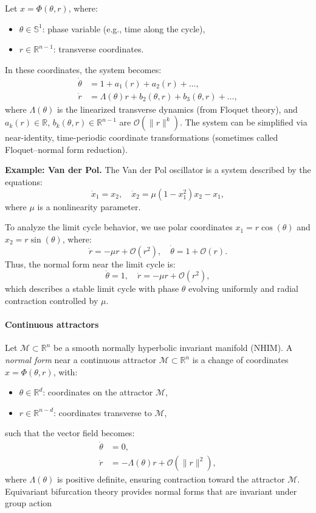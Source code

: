 \documentclass{article}
\theoremstyle{definition} \newtheorem{definition}{Definition}  \newtheorem{example}{Example}
\theoremstyle{remark} \newtheorem{remark}{Remark}
\newcounter{ct}
\newcommand{\field}[1]{\ensuremath{\mathbb{#1}}}
\newcommand{\reals}{\field{R}}
\newcommand{\manifold}{\mathcal{M}}
\begin{document}
Let \( x = \Phi(\theta, r) \), where: %
\begin{itemize}
  \item \( \theta \in \mathbb{S}^1 \): phase variable (e.g., time along the cycle),
  \item \( r \in \mathbb{R}^{n-1} \): transverse coordinates.
\end{itemize}
In these coordinates, the system becomes:
\[
\begin{aligned}
\dot{\theta} &= 1 + a_1(r) + a_2(r) + \dots, \\
\dot{r} &= \Lambda(\theta) r + b_2(\theta, r) + b_3(\theta, r) + \dots,
\end{aligned}
\]
where \( \Lambda(\theta) \) is the linearized transverse dynamics (from Floquet theory),
and  \( a_k(r) \in \mathbb{R} \), \( b_k(\theta, r) \in \mathbb{R}^{n-1} \) are \( \mathcal{O}(\|r\|^k) \).
The system can be simplified via near-identity, time-periodic coordinate transformations (sometimes called Floquet–normal form reduction).

\textbf{Example: Van der Pol.} 
The Van der Pol oscillator is a system described by the equations:
\[
\dot{x}_1 = x_2, \quad \dot{x}_2 = \mu (1 - x_1^2) x_2 - x_1,
\]
where \( \mu \) is a nonlinearity parameter.

To analyze the limit cycle behavior, we use polar coordinates \( x_1 = r \cos(\theta) \) and \( x_2 = r \sin(\theta) \), where:
\[
\dot{r} = -\mu r + \mathcal{O}(r^2), \quad \dot{\theta} = 1 + \mathcal{O}(r).
\]
Thus, the normal form near the limit cycle is:
\[
\dot{\theta} = 1, \quad \dot{r} = -\mu r + \mathcal{O}(r^2),
\]
which describes a stable limit cycle with phase \( \theta \) evolving uniformly and radial contraction controlled by \( \mu \).


\paragraph{Continuous attractors}%
Let $\manifold\subset\reals^n$  be a smooth normally hyperbolic invariant manifold (NHIM).
A \emph{normal form} near a continuous attractor \(\manifold \subset \mathbb{R}^n \) is a change of coordinates 
\( x = \Phi(\theta, r) \), with:
\begin{itemize}
  \item \( \theta \in \mathbb{R}^d \): coordinates on the attractor \( \manifold\),
  \item \( r \in \mathbb{R}^{n-d} \): coordinates transverse to \(\manifold \),
\end{itemize}
such that the vector field becomes:
\[
\begin{aligned}
\dot{\theta} &= 0, \\
\dot{r} &= -\Lambda(\theta) r + \mathcal{O}(\|r\|^2),
\end{aligned}
\]
where \( \Lambda(\theta) \) is positive definite, ensuring contraction toward the attractor \(\manifold\).
%
Equivariant bifurcation theory provides normal forms that are invariant under group action
\end{document}
